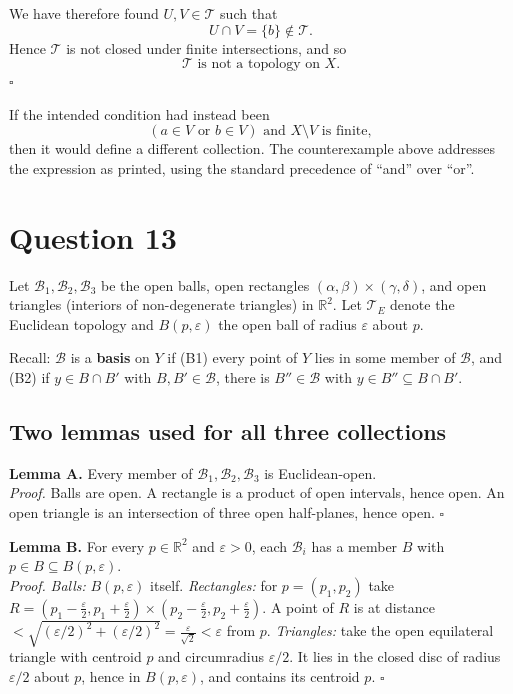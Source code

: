\documentclass[11pt]{article}
\newcommand{\R}{\mathbb{R}}
\newcommand{\T}{\mathcal{T}}
\newcommand{\B}{\mathcal{B}}
\begin{document}
We have therefore found $U,V\in\T$ such that
\[
 U\cap V=\{b\}\notin\T.
\]
Hence $\T$ is not closed under finite intersections, and so
\[
 \boxed{\T\text{ is not a topology on }X.}
\]
\hfill $\square$

\begin{note}
If the intended condition had instead been
\[
 (a\in V\text{ or }b\in V)
 \text{ and }X\setminus V\text{ is finite},
\]
then it would define a different collection. The counterexample above
addresses the expression as printed, using the standard precedence of
``and'' over ``or''.
\end{note}

\section*{Question 13}
Let $\B_1,\B_2,\B_3$ be the open balls, open rectangles $(\alpha,\beta)\times(\gamma,\delta)$, and open triangles (interiors of non-degenerate triangles) in $\R^2$. Let $\T_E$ denote the Euclidean topology and $B(p,\varepsilon)$ the open ball of radius $\varepsilon$ about $p$.

Recall: $\B$ is a \textbf{basis} on $Y$ if (B1) every point of $Y$ lies in some member of $\B$, and (B2) if $y\in B\cap B'$ with $B,B'\in\B$, there is $B''\in\B$ with $y\in B''\subseteq B\cap B'$.

\subsection*{Two lemmas used for all three collections}
\textbf{Lemma A.} Every member of $\B_1,\B_2,\B_3$ is Euclidean-open.\\
\emph{Proof.} Balls are open. A rectangle is a product of open intervals, hence open. An open triangle is an intersection of three open half-planes, hence open. $\square$

\textbf{Lemma B.} For every $p\in\R^2$ and $\varepsilon>0$, each $\B_i$ has a member $B$ with $p\in B\subseteq B(p,\varepsilon)$.\\
\emph{Proof.} \emph{Balls:} $B(p,\varepsilon)$ itself. \emph{Rectangles:} for $p=(p_1,p_2)$ take $R=(p_1-\tfrac\varepsilon2,p_1+\tfrac\varepsilon2)\times(p_2-\tfrac\varepsilon2,p_2+\tfrac\varepsilon2)$. A point of $R$ is at distance $<\sqrt{(\varepsilon/2)^2+(\varepsilon/2)^2}=\tfrac{\varepsilon}{\sqrt2}<\varepsilon$ from $p$. \emph{Triangles:} take the open equilateral triangle with centroid $p$ and circumradius $\varepsilon/2$. It lies in the closed disc of radius $\varepsilon/2$ about $p$, hence in $B(p,\varepsilon)$, and contains its centroid $p$. $\square$
\end{document}
